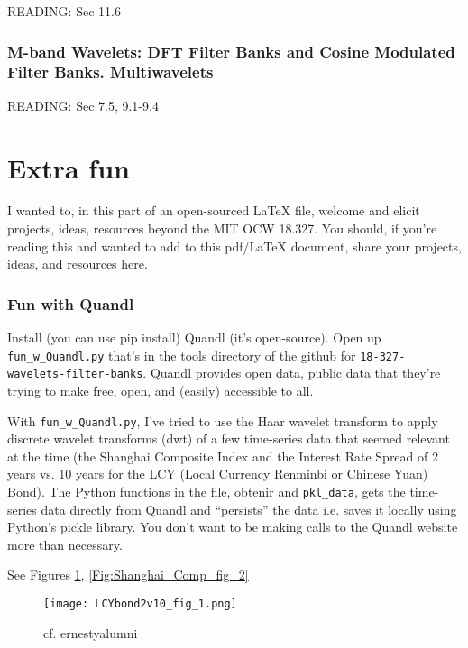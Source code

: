 \documentclass[twoside]{amsart}
\theoremstyle{plain}
\theoremstyle{definition}
\theoremstyle{remark}
\numberwithin{equation}{section}
\begin{document}
READING: Sec 11.6 \cite{GStrangTNguyen1996}



\section{M-band Wavelets: DFT Filter Banks and Cosine Modulated Filter Banks. Multiwavelets}

READING: Sec 7.5, 9.1-9.4 \cite{GStrangTNguyen1996}

\part{Extra fun}

I wanted to, in this part of an open-sourced LaTeX file, welcome and elicit projects, ideas, resources beyond the MIT OCW 18.327.  You should, if you're reading this and wanted to add to this pdf/LaTeX document, share your projects, ideas, and resources here.  

\section{Fun with Quandl}

Install (you can use pip install) Quandl (it's open-source).  Open up \verb|fun_w_Quandl.py| that's in the tools directory of the github for \verb|18-327-wavelets-filter-banks|.  Quandl provides open data, public data that they're trying to make free, open, and (easily) accessible to all.  

With \verb|fun_w_Quandl.py|, I've tried to use the Haar wavelet transform to apply discrete wavelet transforms (dwt) of a few time-series data that seemed relevant at the time (the Shanghai Composite Index and the Interest Rate Spread of 2 years vs. 10 years for the LCY (Local Currency Renminbi or Chinese Yuan) Bond).  The Python functions in the file, obtenir and \verb|pkl_data|, gets the time-series data directly from Quandl and ``persists'' the data i.e. saves it locally using Python's pickle library.  You don't want to be making calls to the Quandl website more than necessary.

See Figures \ref{Fig:LCYbond2v10_fig_1}, \ref{Fig:Shanghai_Comp_fig_2}

\begin{figure}[h!]\label{Fig:LCYbond2v10_fig_1}
 \caption{cf. ernestyalumni}
 \centering
   \texttt{[image: LCYbond2v10\_fig\_1.png]}
\end{figure}
\end{document}

